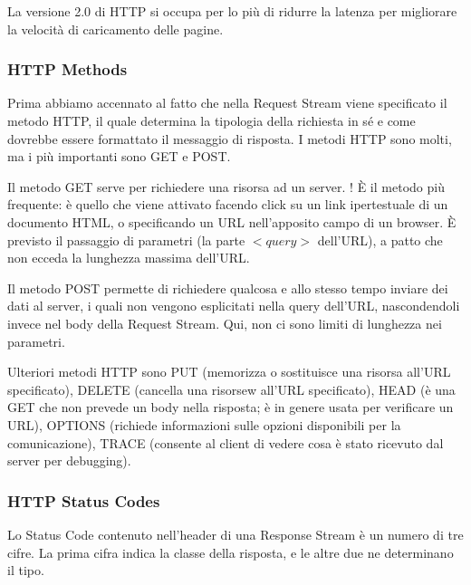 \vspace{3mm}

La versione 2.0 di HTTP si occupa per lo più di ridurre la latenza per migliorare la velocità di caricamento delle pagine.

\subsubsection{HTTP Methods}

\vspace{3mm}

Prima abbiamo accennato al fatto che nella Request Stream viene specificato il metodo HTTP, il quale determina la tipologia della richiesta in sé e come dovrebbe essere formattato il messaggio di risposta. I metodi HTTP sono molti, ma i più importanti sono GET e POST.

\vspace{3mm}

Il metodo GET serve per richiedere una risorsa ad un server. ! È il metodo più frequente: è quello che viene attivato
facendo click su un link ipertestuale di un documento HTML, o specificando un URL nell’apposito campo di un browser. È previsto il passaggio di parametri (la parte \(<query>\) dell’URL), a patto che non ecceda la lunghezza massima dell'URL.

\vspace{3mm}

Il metodo POST permette  di richiedere qualcosa e allo stesso tempo inviare dei dati al server, i quali non vengono esplicitati nella query dell'URL, nascondendoli invece nel body della Request Stream. Qui, non ci sono limiti di lunghezza nei parametri.

\vspace{3mm}

Ulteriori metodi HTTP sono PUT (memorizza o sostituisce una risorsa all'URL specificato), DELETE (cancella una risorsew all'URL specificato), HEAD (è una GET che non prevede un body nella risposta; è in genere usata per verificare un URL), OPTIONS (richiede informazioni sulle opzioni disponibili per la comunicazione), TRACE (consente al client di vedere cosa è stato ricevuto dal server per debugging).

\subsubsection{HTTP Status Codes}

Lo Status Code contenuto nell'header di una Response Stream è un numero di tre cifre. La prima cifra indica la classe della risposta, e le altre due ne determinano il tipo.

